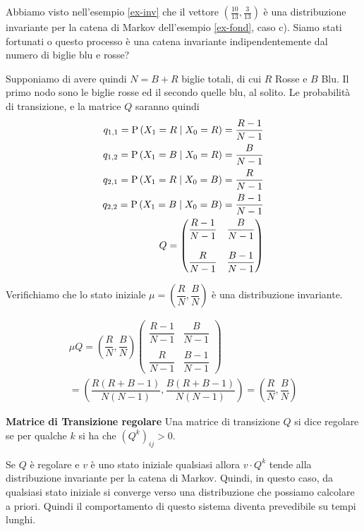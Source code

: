 \begin{exmp} 
Abbiamo visto nell'esempio \ref{ex-inv} che il vettore $ \left( \frac{10}{13}, \frac{3}{13} \right)$ \`e una
distribuzione invariante per la catena di Markov dell'esempio \ref{ex-fond}, caso c). Siamo stati fortunati 
o questo processo \`e una catena invariante indipendentemente dal numero di biglie blu e rosse?

Supponiamo di avere quindi $ N = B + R$ biglie totali, di cui $R $ Rosse e $ B $ Blu. Il primo nodo sono le biglie rosse ed 
il secondo quelle blu, al solito.
Le probabilit\`a di transizione, e la matrice $Q$ saranno quindi 	
	\begin{equation*}
	\begin{aligned}
	q_{1,1} = \text{P}\left(X_1 = R \mid X_0 = R\right) = \dfrac{R-1}{N-1} \\
	q_{1,2} = \text{P}\left(X_1 = B \mid X_0 = R\right) = \dfrac{B}{N-1} \\
	q_{2,1} = \text{P}\left(X_1 = R \mid X_0 = B\right) = \dfrac{R}{N-1} \\
	q_{2,2} = \text{P}\left(X_1 = B \mid X_0 = B\right) = \dfrac{B-1}{N-1} \\
	Q = \begin{pmatrix}
	\dfrac{R-1}{N-1} & \dfrac{B}{N-1} \\
	&\\
	\dfrac{R}{N-1} & \dfrac{B-1}{N-1}
	\end{pmatrix}
	\end{aligned}
	\end{equation*}
	
	Verifichiamo che lo stato iniziale $ \mu = \left(\dfrac{R}{N}, \dfrac{B}{N}\right) $ \`e  una distribuzione invariante.
	
	\begin{equation*}
	\begin{aligned}
	\mu Q = \left(\dfrac{R}{N}, \dfrac{B}{N}\right)\begin{pmatrix}
	\dfrac{R-1}{N-1} & \dfrac{B}{N-1} \\
	&\\
	\dfrac{R}{N-1} & \dfrac{B-1}{N-1}
	\end{pmatrix} \\
	= \left(\dfrac{R(R+B-1)}{N(N-1)} , \dfrac{B(R+B-1)}{N(N-1)}\right) = \left(\dfrac{R}{N}, \dfrac{B}{N}\right)
	\end{aligned}
	\end{equation*}
\end{exmp}



\begin{defn}
	\textbf{Matrice di Transizione regolare}
	Una matrice di transizione $ Q $ si dice regolare se per qualche $k$  si ha che $(Q^k)_{ij} > 0 $.
	 \end{defn}
Se $ Q $ \`e  regolare e $ v $ \`e  uno stato iniziale qualsiasi allora $ v\cdot Q^k $ tende alla distribuzione invariante per la catena di 
Markov. Quindi, in questo caso, da qualsiasi stato iniziale si converge verso una distribuzione che possiamo calcolare a priori. 
Quindi il comportamento di questo sistema diventa prevedibile su tempi lunghi. 

